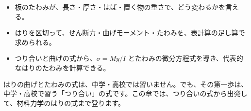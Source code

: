 \newcommand\pxkwall[2]{\begin{scope}[shift={#1}]
  \fill[bkLine!60] (-3.5,-#2/2) rectangle (0,#2/2);
  \draw[bkInk, line width=0.8pt] (0,-#2/2) -- (0,#2/2);
  \pgfmathsetmacro\pxka{-#2/2}\pgfmathsetmacro\pxkb{-#2/2+2}\pgfmathsetmacro\pxkc{#2/2}\foreach \yy in {\pxka,\pxkb,...,\pxkc} {\draw[bkGray, line width=0.4pt] (0,\yy) -- ++(-2.2,-1.6);}
\end{scope}}
\newcommand\pxkload[3]{\draw[bk arrow, bkOrange, line width=1.3pt] ($#1+(0,#2)$) -- #1;
  \node[anchor=south, font=\sffamily\footnotesize, text=bkOrange!70!black, inner sep=1pt] at ($#1+(0,#2+0.3)$) {#3};}
\newcommand\pxkdist[4]{\fill[bkOrange!15] (#1,#3+1.0) rectangle (#2,#3+5);
  \draw[bkOrange, line width=0.6pt] (#1,#3+5) -- (#2,#3+5);
  \foreach \xx in {0,0.125,...,1.0} {\draw[-{Stealth[length=2.2pt]}, bkOrange, line width=0.6pt] ({#1+\xx*(#2-#1)},#3+5) -- ({#1+\xx*(#2-#1)},#3+0.4);}
  \node[anchor=south, font=\sffamily\footnotesize, text=bkOrange!70!black, inner sep=1pt] at ({(#1+#2)/2},#3+5.3) {#4};}
\makeatother


\begin{goal}
\begin{itemize}[label={\color{bkTheme}●}, leftmargin=1.6\zw, itemsep=0pt, topsep=1pt]
\item {}\enspace 板のたわみが、長さ・厚さ・はば・置く物の重さで、どう変わるかを言える。
\item {}\enspace はりを区切って、せん断力・曲げモーメント・たわみを、表計算の足し算で求められる。
\item {}\enspace つり合いと曲げの式から、$\sigma=My/I$ とたわみの微分方程式を導き、代表的なはりのたわみを計算できる。
\end{itemize}
\end{goal}

\noindent はりの曲げとたわみの式は、中学・高校では習いません。でも、その第一歩は、中学・高校で習う「つり合い」の式です。この章では、つり合いの式から出発して、材料力学のはりの式まで登ります。

